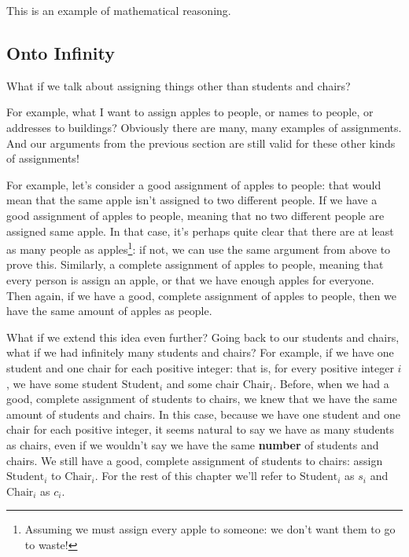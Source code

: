 This is an example of mathematical reasoning.

\subsection{Onto Infinity}


What if we talk about assigning things other than students and chairs?

For example, what I want to assign apples to people, or names to people, or addresses to buildings?
Obviously there are many, many examples of assignments.
And our arguments from the previous section are still valid for these other kinds of assignments!

For example, let's consider a good assignment of apples to people: that would mean that the same apple isn't assigned to two different people.
If we have a good assignment of apples to people, meaning that no two different people are assigned same apple.
In that case, it's perhaps quite clear that there are at least as many people as apples\footnote{Assuming we must assign every apple to someone: we don't want them to go to waste!}: if not, we can use the same argument from above to prove this.
Similarly, a complete assignment of apples to people, meaning that every person is assign an apple, or that we have enough apples for everyone.
Then again, if we have a good, complete assignment of apples to people, then we have the same amount of apples as people.

What if we extend this idea even further?
Going back to our students and chairs, what if we had infinitely many students and chairs?
For example, if we have one student and one chair for each  positive integer: that is, for every positive integer $i$, we have some student $\text{Student}_i$ and some chair $\text{Chair}_i$.
Before, when we had a good, complete assignment of students to chairs, we knew that we have the same amount of students and chairs.
In this case, because we have one student and one chair for each positive integer, it seems natural to say we have as many students as chairs, even if we wouldn't say we have the same \textbf{number} of students and chairs.
We still have a good, complete assignment of students to chairs: assign $\text{Student}_i$ to $\text{Chair}_i$.
For the rest of this chapter we'll refer to $\text{Student}_i$ as $s_i$ and $\text{Chair}_i$ as $c_i$.

